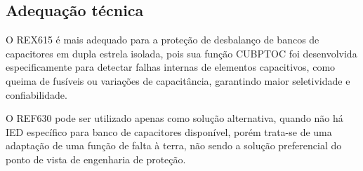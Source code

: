 \documentclass[12pt,a4paper]{article}
\begin{document}
	\subsection*{Adequação técnica}
	
	O REX615 é mais adequado para a proteção de desbalanço de bancos de capacitores em dupla estrela isolada, pois sua função CUBPTOC foi desenvolvida especificamente para detectar falhas internas de elementos capacitivos, como queima de fusíveis ou variações de capacitância, garantindo maior seletividade e confiabilidade.
	
	O REF630 pode ser utilizado apenas como solução alternativa, quando não há IED específico para banco de capacitores disponível, porém trata-se de uma adaptação de uma função de falta à terra, não sendo a solução preferencial do ponto de vista de engenharia de proteção.
	
\end{document}
